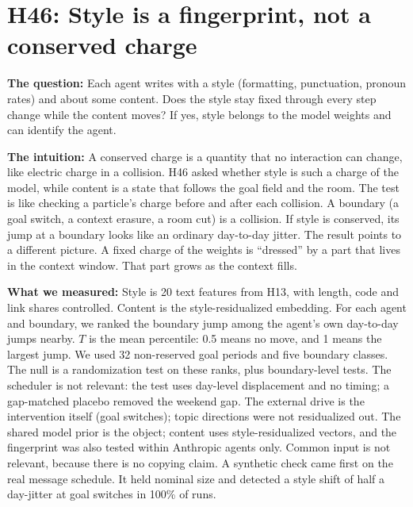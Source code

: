 \section{H46: Style is a fingerprint, not a conserved charge}

\textbf{The question:} Each agent writes with a style (formatting, punctuation, pronoun rates) and about some content. Does the style stay fixed through every step change while the content moves? If yes, style belongs to the model weights and can identify the agent.

\textbf{The intuition:} A conserved charge is a quantity that no interaction can change, like electric charge in a collision. H46 asked whether style is such a charge of the model, while content is a state that follows the goal field and the room. The test is like checking a particle's charge before and after each collision. A boundary (a goal switch, a context erasure, a room cut) is a collision. If style is conserved, its jump at a boundary looks like an ordinary day-to-day jitter. The result points to a different picture. A fixed charge of the weights is ``dressed'' by a part that lives in the context window. That part grows as the context fills.

\textbf{What we measured:} Style is 20 text features from H13, with length, code and link shares controlled. Content is the style-residualized embedding. For each agent and boundary, we ranked the boundary jump among the agent's own day-to-day jumps nearby. $T$ is the mean percentile: 0.5 means no move, and 1 means the largest jump. We used 32 non-reserved goal periods and five boundary classes. The null is a randomization test on these ranks, plus boundary-level tests. The scheduler is not relevant: the test uses day-level displacement and no timing; a gap-matched placebo removed the weekend gap. The external drive is the intervention itself (goal switches); topic directions were not residualized out. The shared model prior is the object; content uses style-residualized vectors, and the fingerprint was also tested within Anthropic agents only. Common input is not relevant, because there is no copying claim. A synthetic check came first on the real message schedule. It held nominal size and detected a style shift of half a day-jitter at goal switches in 100\% of runs.

